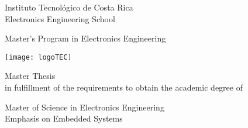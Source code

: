
\thispagestyle{empty} 

\begin{center}

Instituto Tecnol\'ogico de Costa Rica \\
Electronics Engineering School

Master's Program in Electronics Engineering

\par\vspace{20mm}

\texttt{[image: logoTEC]}

\par\vspace*{\fill}

{\LARGE\bf{\textsf{\scriptTitle}}}

\par\vspace*{\fill}

Master Thesis \\ 
in fulfillment of the requirements to obtain the academic degree of

Master of Science in Electronics Engineering \\
Emphasis on Embedded Systems

\par\vspace{20mm}

\scriptAuthor

\vspace*{\fill}


\end{center}
\newpage 
\cleardoublepage  
